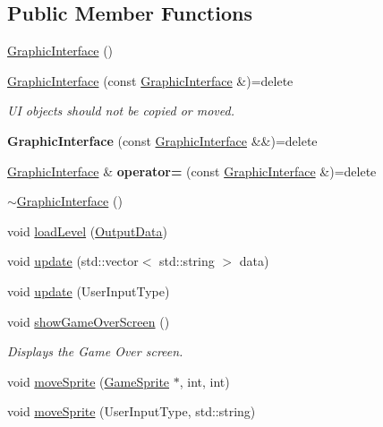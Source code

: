 \subsection*{Public Member Functions}
\begin{DoxyCompactItemize}
\item 
\mbox{\hyperlink{class_graphic_interface_accff331d036826a9c43e7bcd39165dc2}{Graphic\+Interface}} ()
\item 
\mbox{\label{class_graphic_interface_ad36aed285f05abff15f0991810ea2bde}} 
\mbox{\hyperlink{class_graphic_interface_ad36aed285f05abff15f0991810ea2bde}{Graphic\+Interface}} (const \mbox{\hyperlink{class_graphic_interface}{Graphic\+Interface}} \&)=delete
\begin{DoxyCompactList}\small\item\em UI objects should not be copied or moved. \end{DoxyCompactList}\item 
\mbox{\label{class_graphic_interface_aa89a56ec49a83a0f6ae3de05c86d6e80}} 
{\bfseries Graphic\+Interface} (const \mbox{\hyperlink{class_graphic_interface}{Graphic\+Interface}} \&\&)=delete
\item 
\mbox{\label{class_graphic_interface_ac7bd13606ffcf7c14e35990c3ad4d868}} 
\mbox{\hyperlink{class_graphic_interface}{Graphic\+Interface}} \& {\bfseries operator=} (const \mbox{\hyperlink{class_graphic_interface}{Graphic\+Interface}} \&)=delete
\item 
\mbox{\hyperlink{class_graphic_interface_a48f212964040a5baf30035420305c1f9}{$\sim$\+Graphic\+Interface}} ()
\item 
void \mbox{\hyperlink{class_graphic_interface_a4237627c03422b22653a3a462bd1daa2}{load\+Level}} (\mbox{\hyperlink{class_output_data}{Output\+Data}})
\item 
void \mbox{\hyperlink{class_graphic_interface_a250275a6b20097a3c3435a9af4d1cd75}{update}} (std\+::vector$<$ std\+::string $>$ data)
\item 
void \mbox{\hyperlink{class_graphic_interface_abb3581948def6522f616e9f3ce1c40ac}{update}} (User\+Input\+Type)
\item 
\mbox{\label{class_graphic_interface_adc91101675b7727393c747a06db7e4e2}} 
void \mbox{\hyperlink{class_graphic_interface_adc91101675b7727393c747a06db7e4e2}{show\+Game\+Over\+Screen}} ()
\begin{DoxyCompactList}\small\item\em Displays the Game Over screen. \end{DoxyCompactList}\item 
void \mbox{\hyperlink{class_graphic_interface_a2a52c6fef543c4f130f62ee4552648f9}{move\+Sprite}} (\mbox{\hyperlink{class_game_sprite}{Game\+Sprite}} $\ast$, int, int)
\item 
void \mbox{\hyperlink{class_graphic_interface_a8062b59b90fa4075903ddc122f2ba8ed}{move\+Sprite}} (User\+Input\+Type, std\+::string)
\end{DoxyCompactItemize}


